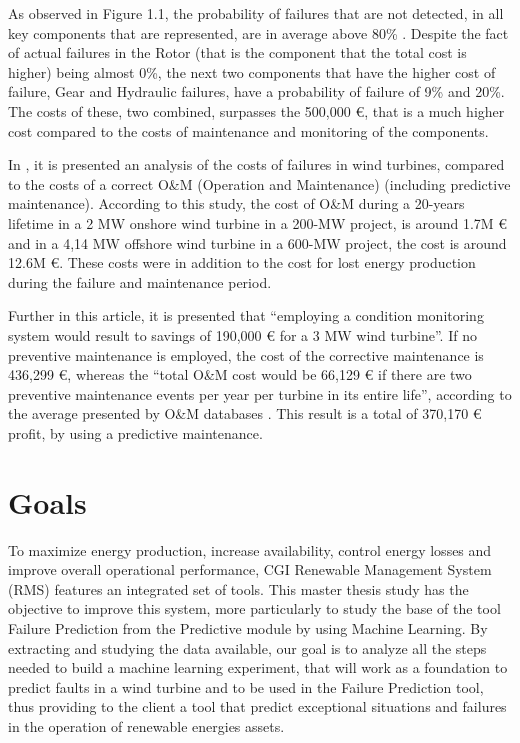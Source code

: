 As observed in Figure 1.1, the probability of failures that are not detected, in all key components that are represented, are in average above 80\% . Despite the fact of actual failures in the Rotor (that is the component that the total cost is higher) being almost 0\%, the next two components that have the higher cost of failure, Gear and Hydraulic failures, have a probability of failure of 9\%  and 20\%. The costs of these, two combined, surpasses the 500,000 €, that is a much higher cost compared to the costs of maintenance and monitoring of the components.


In \cite{OLD_53_WIND}, it is presented an analysis of the costs of failures in wind turbines, compared to the costs of a correct O&M (Operation and Maintenance) (including predictive maintenance). According to this study, the cost of O\&M during a 20-years lifetime in a 2 MW onshore wind turbine in a 200-MW project, is around 1.7M € and in a 4,14 MW offshore wind turbine in a 600-MW project, the cost is around 12.6M €. These costs were in addition to the cost for lost energy production during the failure and maintenance period.

Further in this article, it is presented that “employing a condition monitoring system would result to savings of 190,000 € for a 3 MW wind turbine”. If no preventive maintenance is employed, the cost of the corrective maintenance is 436,299 €, whereas the “total O\&M cost would be 66,129 € if there are two preventive maintenance events per year per turbine in its entire life”, according to the average presented by O&M databases \cite{OLD_53_WIND}. This result is a total of 370,170 € profit, by using a predictive maintenance.

\section{Goals} 
\label{sub:if_you_use_this_template} 

To maximize energy production, increase availability, control energy losses and improve overall operational performance, CGI Renewable Management System (RMS) \cite{OLD_8} features an integrated set of tools. This master thesis study has the objective to improve this system, more particularly to study the base of the tool Failure Prediction from the Predictive module by using Machine Learning. By extracting and studying the data available, our goal is to analyze all the steps needed to build a machine learning experiment, that will work as a foundation to predict faults in a wind turbine and to be used in the Failure Prediction tool, thus providing to the client a tool that predict exceptional situations and failures in the operation of renewable energies assets.

